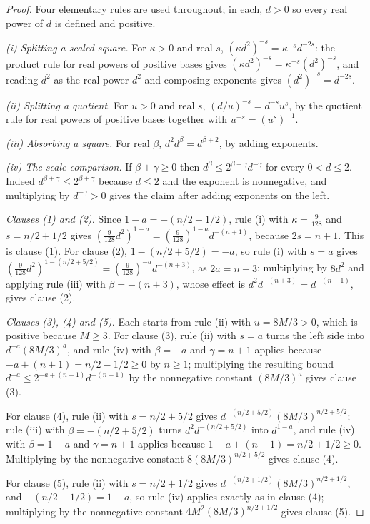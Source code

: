 \begin{proof}
Four elementary rules are used throughout; in each, $d > 0$ so every real power
of $d$ is defined and positive.

\emph{(i) Splitting a scaled square.}
For $\kappa > 0$ and real $s$,
$(\kappa d^2)^{-s} = \kappa^{-s}d^{-2s}$: the product rule for real powers of
positive bases gives $(\kappa d^2)^{-s} = \kappa^{-s}(d^2)^{-s}$, and reading
$d^2$ as the real power $d^{2}$ and composing exponents gives
$(d^{2})^{-s} = d^{-2s}$.

\emph{(ii) Splitting a quotient.}
For $u > 0$ and real $s$, $(d/u)^{-s} = d^{-s}u^{s}$, by the quotient rule for
real powers of positive bases together with $u^{-s} = (u^{s})^{-1}$.

\emph{(iii) Absorbing a square.}
For real $\beta$, $d^2d^{\beta} = d^{\beta+2}$, by adding exponents.

\emph{(iv) The scale comparison.}
If $\beta + \gamma \geq 0$ then $d^{\beta} \leq 2^{\beta+\gamma}d^{-\gamma}$ for
every $0 < d \leq 2$.  Indeed $d^{\beta+\gamma} \leq 2^{\beta+\gamma}$ because
$d \leq 2$ and the exponent is nonnegative, and multiplying by
$d^{-\gamma} > 0$ gives the claim after adding exponents on the left.

\emph{Clauses (1) and (2).}
Since $1 - a = -(n/2+1/2)$, rule (i) with $\kappa = \tfrac9{128}$ and
$s = n/2+1/2$ gives
$(\tfrac9{128}d^2)^{1-a} = (\tfrac9{128})^{1-a}d^{-(n+1)}$, because
$2s = n+1$.  This is clause (1).  For clause (2), $1-(n/2+5/2) = -a$, so rule
(i) with $s = a$ gives
$(\tfrac9{128}d^2)^{1-(n/2+5/2)} = (\tfrac9{128})^{-a}d^{-(n+3)}$, as
$2a = n+3$; multiplying by $8d^2$ and applying rule (iii) with
$\beta = -(n+3)$, whose effect is $d^2d^{-(n+3)} = d^{-(n+1)}$, gives clause (2).

\emph{Clauses (3), (4) and (5).}
Each starts from rule (ii) with $u = 8M/3 > 0$, which is positive because
$M \geq 3$.  For clause (3), rule (ii) with $s = a$ turns the left side into
$d^{-a}(8M/3)^{a}$, and rule (iv) with $\beta = -a$ and $\gamma = n+1$ applies
because $-a + (n+1) = n/2 - 1/2 \geq 0$ by $n \geq 1$; multiplying the resulting
bound $d^{-a} \leq 2^{-a+(n+1)}d^{-(n+1)}$ by the nonnegative constant
$(8M/3)^{a}$ gives clause (3).

For clause (4), rule (ii) with $s = n/2+5/2$ gives
$d^{-(n/2+5/2)}(8M/3)^{n/2+5/2}$; rule (iii) with $\beta = -(n/2+5/2)$ turns
$d^2d^{-(n/2+5/2)}$ into $d^{1-a}$, and rule (iv) with $\beta = 1-a$ and
$\gamma = n+1$ applies because $1-a+(n+1) = n/2+1/2 \geq 0$.  Multiplying by the
nonnegative constant $8(8M/3)^{n/2+5/2}$ gives clause (4).

For clause (5), rule (ii) with $s = n/2+1/2$ gives
$d^{-(n/2+1/2)}(8M/3)^{n/2+1/2}$, and $-(n/2+1/2) = 1-a$, so rule (iv) applies
exactly as in clause (4); multiplying by the nonnegative constant
$4M^2(8M/3)^{n/2+1/2}$ gives clause (5).
\end{proof}
